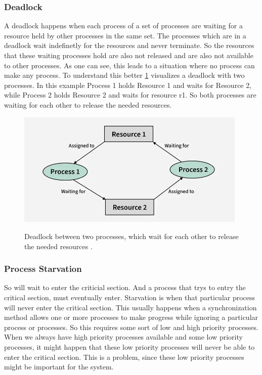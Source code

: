 \subsubsection{Deadlock}\label{subsubsec:deadlock}

A deadlock happens when each process of a set of processes are waiting for a resource held by other processes in the same set. The processes which are in a deadlock wait indefinetly for the resources and never terminate. So the resources that these waiting processes hold are also not released and are also not available to other processes. As one can see, this leads to a situation where no process can make any process. To understand this better \cref{fig:deadlock} visualizes a deadlock with two processes. In this example Process 1 holds Resource 1 and waits for Resource 2, while Process 2 holds Resource 2 and waits for resource r1. So both processes are waiting for each other to release the needed resources. \cite{Deadlock,chahar2013deadlock}

\begin{figure}[h!]
   \centering
   \captionsetup{justification=centering}
   \caption{Deadlock between two processes, which wait for each other to release the needed resources \cite{Deadlock}.}
   \includegraphics[width=110mm]{images/deadlock.png}
   \label{fig:deadlock}
\end{figure}

\subsubsection{Process Starvation}\label{subsubsec:process-starvation}

So will wait to enter the criticial section. And a process that trys to entry the critical section, must eventually enter. Starvation is when that particular process will never enter the critical section. This usually happens when a synchronization method allows one or more processes to make progress while ignoring a particular process or processes. So this requires some sort of low and high priority processes. When we always have high priority processes available and some low priority processes, it might happen that these low priority processes will never be able to enter the critical section. This is a problem, since these low priority processes might be important for the system. \cite{Starvation}

